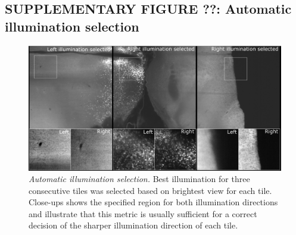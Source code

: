 \documentclass[]{spie}  %
\begin{document}
\pagebreak

\subsection*{SUPPLEMENTARY FIGURE ??: Automatic illumination selection}
\vspace{1mm}
\begin{figure}[h!]
\includegraphics[width=\textwidth]{Illu_Select.png}
\vspace{-2.0mm}
\caption{\hspace{-0.5mm} \emph{Automatic illumination selection.} Best illumination for three consecutive tiles was selected based on brightest view for each tile. Close-ups shows the specified region for both illumination directions and illustrate that this metric is usually sufficient for a correct decision of the sharper illumination direction of each tile.
}
\label{fig:sup-fig-illu-select}
\end{figure}

\pagebreak
\end{document}
